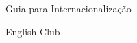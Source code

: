 \begin{titlepage}
    \begin{center}

      \vspace*{8cm}
        \Huge
        \rmfamily
	Guia para Internacionalização

        \vspace*{2cm}
        \Huge
	English Club

      \end{center}
\end{titlepage}
